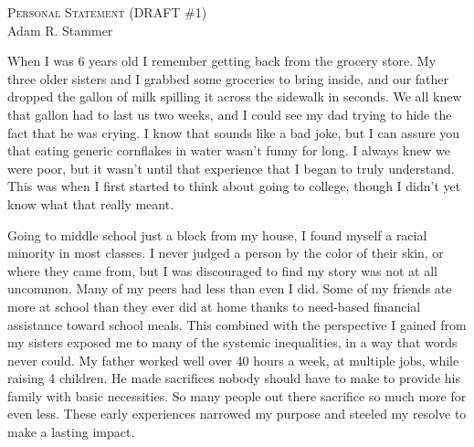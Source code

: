 \setlength{\oddsidemargin}{0in}
\setlength{\evensidemargin}{0in}
\setlength{\textwidth}{6.5in}
\setlength{\topmargin}{-.3in}
\setlength{\textheight}{9in}
\pagestyle{empty}



\newcommand{\university}{University of Minnesota }
\newcommand{\uni}{UMN }





\begin{center}
{\Large \huge \scshape Personal Statement (DRAFT \#1)} \\[.3in]
{\large Adam R. Stammer}
\end{center}

\vspace*{.1in}

When I was 6 years old I remember getting back from the grocery store. My three older sisters and I grabbed some groceries to bring inside, and our father dropped the gallon of milk spilling it across the sidewalk in seconds. We all knew that gallon had to last us two weeks, and I could see my dad trying to hide the fact that he was crying. I know that sounds like a bad joke, but I can assure you that eating generic cornflakes in water wasn't funny for long. I always knew we were poor, but it wasn't until that experience that I began to truly understand. This was when I first started to think about going to college, though I didn't yet know what that really meant.

Going to middle school just a block from my house, I found myself a racial minority in most classes. I never judged a person by the color of their skin, or where they came from, but I was discouraged to find my story was not at all uncommon. Many of my peers had less than even I did. Some of my friends ate more at school than they ever did at home thanks to need-based financial assistance toward school meals. This combined with the perspective I gained from my sisters exposed me to many of the systemic inequalities, in a way that words never could. My father worked well over 40 hours a week, at multiple jobs, while raising 4 children. He made sacrifices nobody should have to make to provide his family with basic necessities. So many people out there sacrifice so much more for even less. These early experiences narrowed my purpose and steeled my resolve to make a lasting impact.

